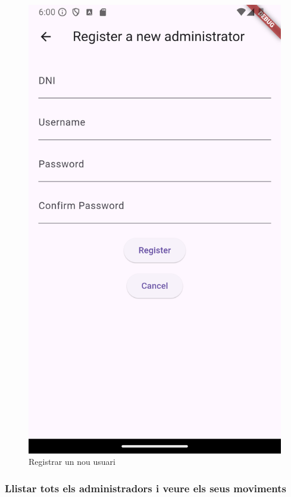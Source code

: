 \documentclass[a4paper,12pt,twoside]{ThesisStyle}
\begin{document}
\begin{figure}[h]
\begin{minipage}{0.31\textwidth}
        \includegraphics[width=\linewidth]{imatges/adminadd3.png}
    \end{minipage}
    \caption{Registrar un nou usuari}
    \label{fig: Registrar un nou usuari}
\end{figure}




\clearpage
\subsubsection{Llistar tots els administradors i veure els seus moviments}
\label{subsubsec: Llistar tots els administradors i veure els seus moviments}
\end{document}
